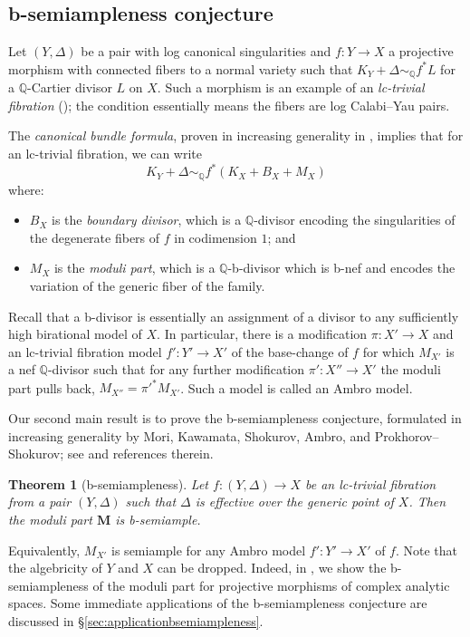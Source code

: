 \documentclass{amsart}
\newtheorem{thm}[theorem]{Theorem}
\theoremstyle{definition}
\theoremstyle{remark}
\def\bQ{\mathbb{Q}}
\newcommand\bfM{{\bf M}}
\def\bfM{\mathbf{M}}
\numberwithin{equation}{section}
\begin{document}
\subsection{ b-semiampleness conjecture} 

Let $(Y,\Delta)$ be a pair with log canonical singularities and $f \colon Y\to X$ a projective morphism with connected fibers to a normal variety such that $K_Y+\Delta\sim_\bQ f^*L$ for a $\bQ$-Cartier divisor $L$ on $X$.  Such a morphism is an example of an \emph{lc-trivial fibration} (); the condition essentially means the fibers are log Calabi--Yau pairs.

The \emph{canonical bundle formula},
proven in increasing generality in
\cite{Kod1,Kod2,Fuj86,Kaw1998,FM00, AmbroPhD, Amb04,
Amb05,FG14},
implies that for an lc-trivial fibration, we can write
\[K_Y+\Delta\sim_\bQ f^*(K_X + B_X + M_X)\]
where:
\begin{itemize}
\item $B_X$ is the \emph{boundary divisor}, which is a $\bQ$-divisor encoding the singularities of the degenerate fibers of $f$ in codimension $1$; and
\item $M_X$ is the \emph{moduli part}, which is a $\bQ$-b-divisor which is  b-nef and encodes the variation of the generic fiber of the family.  
\end{itemize}
Recall that a  b-divisor is essentially an assignment of a divisor to any sufficiently high birational model of $X$.  In particular, there is a modification $\pi \colon X'\to X$ and an lc-trivial fibration model $f' \colon Y'\to X'$ of the base-change of $f$ for which $M_{X'}$ is a nef $\bQ$-divisor such that for any further modification $\pi' \colon X''\to X'$ the moduli part pulls back, $M_{X''}=\pi'^*M_{X'}$.
Such a model is called an Ambro model.

Our second main result is to prove the  b-semiampleness conjecture,
formulated in increasing generality by Mori, Kawamata, Shokurov, Ambro, and Prokhorov--Shokurov; see \cite{Mor87,AmbroPhD,PS09} and references therein.

\begin{thm}[b-semiampleness]\label{thm:Bsemimain}
Let $f \colon (Y,\Delta)\to X$ be an lc-trivial fibration from a pair $(Y,\Delta)$
such that $\Delta$ is effective over the generic point of $X$.
Then the moduli part $\bfM$ is  b-semiample.  
\end{thm}
Equivalently, $M_{X'}$ is semiample for any Ambro model $f' \colon Y'\to X'$ of $f$. Note that the algebricity of $Y$ and $X$ can be dropped. Indeed, in , we show the  b-semiampleness of the moduli part for projective morphisms of complex analytic spaces. Some immediate applications of the  b-semiampleness conjecture are discussed in \S \ref{sec:applicationbsemiampleness}.  
\end{document}

